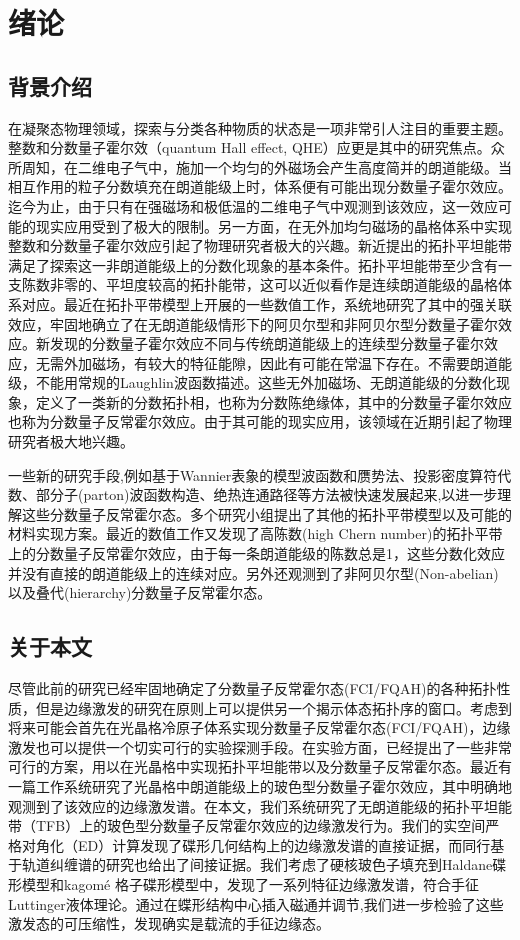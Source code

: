 \chapter{绪论}
\label{introduction}

\section{背景介绍}
在凝聚态物理领域，探索与分类各种物质的状态是一项非常引人注目的重要主题。整数和分数量子霍尔效（quantum Hall effect, QHE）应更是其中的研究焦点。众所周知，在二维电子气中，施加一个均匀的外磁场会产生高度简并的朗道能级。当相互作用的粒子分数填充在朗道能级上时，体系便有可能出现分数量子霍尔效应。迄今为止，由于只有在强磁场和极低温的二维电子气中观测到该效应，这一效应可能的现实应用受到了极大的限制。另一方面，在无外加均匀磁场的晶格体系中实现整数和分数量子霍尔效应引起了物理研究者极大的兴趣。新近提出的拓扑平坦能带满足了探索这一非朗道能级上的分数化现象的基本条件。拓扑平坦能带至少含有一支陈数非零的、平坦度较高的拓扑能带，这可以近似看作是连续朗道能级的晶格体系对应。最近在拓扑平带模型上开展的一些数值工作，系统地研究了其中的强关联效应，牢固地确立了在无朗道能级情形下的阿贝尔型和非阿贝尔型分数量子霍尔效应。新发现的分数量子霍尔效应不同与传统朗道能级上的连续型分数量子霍尔效应，无需外加磁场，有较大的特征能隙，因此有可能在常温下存在。不需要朗道能级，不能用常规的Laughlin波函数描述。这些无外加磁场、无朗道能级的分数化现象，定义了一类新的分数拓扑相，也称为分数陈绝缘体，其中的分数量子霍尔效应也称为分数量子反常霍尔效应。由于其可能的现实应用，该领域在近期引起了物理研究者极大地兴趣。

一些新的研究手段,例如基于Wannier表象的模型波函数和赝势法、投影密度算符代数、部分子(parton)波函数构造、绝热连通路径等方法被快速发展起来,以进一步理解这些分数量子反常霍尔态。多个研究小组提出了其他的拓扑平带模型以及可能的材料实现方案。最近的数值工作又发现了高陈数(high Chern number)的拓扑平带上的分数量子反常霍尔效应，由于每一条朗道能级的陈数总是1，这些分数化效应并没有直接的朗道能级上的连续对应。另外还观测到了非阿贝尔型(Non-abelian)以及叠代(hierarchy)分数量子反常霍尔态。


\section{关于本文}
尽管此前的研究已经牢固地确定了分数量子反常霍尔态(FCI/FQAH)的各种拓扑性质，但是边缘激发的研究在原则上可以提供另一个揭示体态拓扑序的窗口。考虑到将来可能会首先在光晶格冷原子体系实现分数量子反常霍尔态(FCI/FQAH)，边缘激发也可以提供一个切实可行的实验探测手段。在实验方面，已经提出了一些非常可行的方案，用以在光晶格中实现拓扑平坦能带以及分数量子反常霍尔态。最近有一篇工作系统研究了光晶格中朗道能级上的玻色型分数量子霍尔效应，其中明确地观测到了该效应的边缘激发谱。在本文，我们系统研究了无朗道能级的拓扑平坦能带（TFB）上的玻色型分数量子反常霍尔效应的边缘激发行为。我们的实空间严格对角化（ED）计算发现了碟形几何结构上的边缘激发谱的直接证据，而同行基于轨道纠缠谱的研究也给出了间接证据。我们考虑了硬核玻色子填充到Haldane碟形模型和kagom\'{e} 格子碟形模型中，发现了一系列特征边缘激发谱，符合手征Luttinger液体理论。通过在蝶形结构中心插入磁通并调节,我们进一步检验了这些激发态的可压缩性，发现确实是载流的手征边缘态。